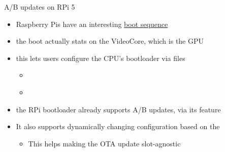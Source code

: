 \begin{frame}{A/B updates on RPi 5}
  \begin{itemize}
    \item Raspberry Pis have an interesting \href{https://www.raspberrypi.com/documentation/computers/raspberry-pi.html\#boot-sequence}{boot sequence}
    \item the boot actually stats on the VideoCore, which is the GPU
    \item this lets users configure the CPU's bootloader via  files
    \begin{itemize}
      \item \href{https://www.raspberrypi.com/documentation/computers/config_txt.html\#what-is-config-txt}{}
      \item \href{https://www.raspberrypi.com/documentation/computers/config_txt.html\#autoboot-txt}{}
    \end{itemize}
    \item the RPi bootloader already supports A/B updates, via its 
          \href{https://www.raspberrypi.com/documentation/computers/config_txt.html\#the-tryboot-filter}{} feature
    \item It also supports dynamically changing configuration based on the
          \href{https://www.raspberrypi.com/documentation/computers/config_txt.html\#boot_partition-2}{}
    \begin{itemize}
      \item This helps making the OTA update slot-agnostic
    \end{itemize}
  \end{itemize}
\end{frame}

